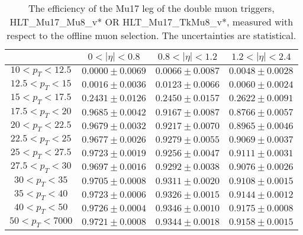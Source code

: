 \begin{table}[!ht]
\begin{center}
\begin{tabular}{c|c|c|c}
\hline & $0 < |\eta| < 0.8$ & $0.8 < |\eta| < 1.2$ & $1.2 < |\eta| < 2.4$  \\
\hline
$ 10 < p_T < 12.5$ & $0.0000 \pm 0.0069$ & $0.0066 \pm 0.0087$ & $0.0048 \pm 0.0028$  \\
$12.5 < p_T <  15$ & $0.0016 \pm 0.0036$ & $0.0123 \pm 0.0066$ & $0.0060 \pm 0.0024$  \\
$ 15 < p_T < 17.5$ & $0.2431 \pm 0.0126$ & $0.2450 \pm 0.0157$ & $0.2622 \pm 0.0091$  \\
$17.5 < p_T <  20$ & $0.9685 \pm 0.0042$ & $0.9167 \pm 0.0087$ & $0.8766 \pm 0.0057$  \\
$ 20 < p_T < 22.5$ & $0.9679 \pm 0.0032$ & $0.9217 \pm 0.0070$ & $0.8965 \pm 0.0046$  \\
$22.5 < p_T <  25$ & $0.9677 \pm 0.0026$ & $0.9279 \pm 0.0055$ & $0.9069 \pm 0.0037$  \\
$ 25 < p_T < 27.5$ & $0.9723 \pm 0.0019$ & $0.9256 \pm 0.0047$ & $0.9111 \pm 0.0031$  \\
$27.5 < p_T <  30$ & $0.9697 \pm 0.0016$ & $0.9292 \pm 0.0038$ & $0.9076 \pm 0.0026$  \\
$ 30 < p_T <  35$ & $0.9705 \pm 0.0008$ & $0.9311 \pm 0.0020$ & $0.9108 \pm 0.0015$  \\
$ 35 < p_T <  40$ & $0.9723 \pm 0.0006$ & $0.9326 \pm 0.0015$ & $0.9144 \pm 0.0012$  \\
$ 40 < p_T <  50$ & $0.9726 \pm 0.0004$ & $0.9346 \pm 0.0010$ & $0.9175 \pm 0.0008$  \\
$ 50 < p_T < 7000$ & $0.9721 \pm 0.0008$ & $0.9344 \pm 0.0018$ & $0.9158 \pm 0.0015$  \\
\hline
\hline
\end{tabular}
\caption{The efficiency of the Mu17 leg of the double muon triggers,
HLT\_Mu17\_Mu8\_v* OR HLT\_Mu17\_TkMu8\_v*,
measured with respect to the offline muon selection. 
The uncertainties are statistical.}
\label{tab:eff_muon_lead_dbl}
\end{center}
\end{table}


